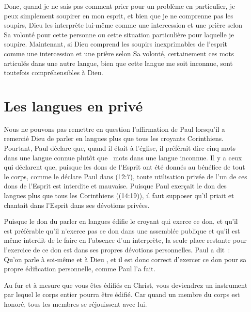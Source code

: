 Donc, quand je ne sais pas comment prier pour un problème en particulier,
 je peux simplement soupirer en mon esprit, et bien que je ne comprenne pas
 les soupirs, Dieu les interprète lui-même comme une intercession
 et une prière selon Sa volonté pour cette personne ou cette situation
 particulière pour laquelle je soupire. Maintenant, si Dieu comprend
 les soupirs inexprimables de l'esprit comme une intercession
 et une prière selon Sa volonté, certainement ces mots articulés
 dans une autre langue, bien que cette langue me soit inconnue,
 sont toutefois compréhensibles à Dieu.


\section*{Les langues en privé}

\begin{specialpar}{}
Nous ne pouvons pas remettre en question l'affirmation de Paul lorsqu'il
 a remercié Dieu de parler en langues plus que tous les croyants Corinthiens.
 Pourtant, Paul déclare que, quand il était à l'église, il préférait dire
 cinq mots dans une langue connue plutôt que ~mots
 dans une langue inconnue. Il y a ceux qui déclarent que, puisque les dons
 de l'Esprit ont été donnés au bénéfice de tout le corps, comme le déclare
 Paul dans (12:7), toute utilisation privée
 de l'un de ces dons de l'Esprit est interdite et mauvaise.
 Puisque Paul exerçait le don des langues plus que tous les Corinthiens
 ((14:19)), il faut supposer qu'il priait et chantait
 dans l'Esprit dans ses dévotions privées.
\end{specialpar}

Puisque le don du parler en langues édifie le croyant qui exerce ce don,
 et qu'il est préférable qu'il n'exerce pas ce don dans une assemblée publique
 et qu'il est même interdit de le faire en l'absence d'un interprète,
 la seule place restante pour l'exercice de ce don est dans ses propres
 dévotions personnelles. Paul a dit~:
 \og Qu'on parle à soi-même et à Dieu \fg{}, et il est donc correct
 d'exercer ce don pour sa propre édification personnelle, comme Paul l'a fait.

Au fur et à mesure que vous êtes édifiés en Christ, vous deviendrez
 un instrument par lequel le corps entier pourra être édifié.
 Car quand un membre du corps est honoré, tous les membres
 se réjouissent avec lui.


\closechapter
